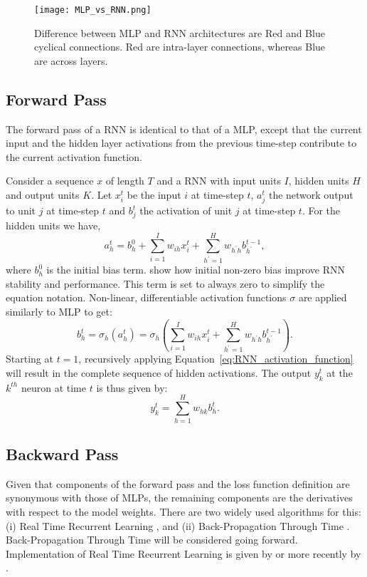 \begin{figure}[ht!]
	\centering
	\texttt{[image: MLP\_vs\_RNN.png]}
	\caption[Difference between MLP and RNN architectures.]{Difference between MLP and RNN architectures are Red and Blue cyclical connections. Red are intra-layer connections, whereas Blue are across layers.}
	\label{fig:MLP_vs_RNN}
\end{figure}

\subsection{Forward Pass}
The forward pass of a RNN is identical to that of a MLP, except that the current input and the hidden layer activations from the previous time-step contribute to the current activation function. 

Consider a sequence $x$ of length $T$ and a RNN with input units $I$, hidden units $H$ and output units $K$. Let $x_i^t$ be the input $i$ at time-step $t$, $a_j^t$
the network output to unit $j$ at time-step $t$ and $b_j^t$ the activation of unit $j$ at time-step $t$. For the hidden units we have,
\begin{equation}
	a_h^t=b_h^0+\sum_{i=1}^{I} w_{ih} x_i^t +\sum_{h^{'}=1}^{H}w_{h^{'}h} b_{h^{'}}^{t-1},
\end{equation}
where $b_h^0$ is the initial bias term. \cite{Zimmermann2006} show how initial non-zero bias improve RNN stability and performance. This term is set to always zero to simplify the equation notation. Non-linear, differentiable activation functions $\sigma$ are applied similarly to MLP to get:
\begin{equation}\label{eq:RNN_activation_function}
	b_h^t=\sigma_h \left(a_h^t\right)=\sigma_h \left(\sum_{i=1}^{I}w_{ih} x_i^t +\sum_{h^{'}=1}^{H} w_{h^{'} h} b_{h^{'}}^{t-1} \right).
\end{equation}
Starting at $t = 1$, recursively applying Equation~\ref{eq:RNN_activation_function} will result in the complete sequence of hidden activations. The output $y_k^t$ at the $k^{th}$ neuron at time $t$ is thus given by:
\begin{equation}
	y_k^t=\sum_{h=1}^{H}w_{hk} b_h^t.
\end{equation}
\subsection{Backward Pass}
Given that components of the forward pass and the loss function definition are synonymous with those of MLPs, the remaining components are the derivatives with respect to the model weights. There are two widely used algorithms for this: (i) Real Time Recurrent Learning \citep{Robinson1987}, and (ii) Back-Propagation Through Time \citep{Werbos1988}. Back-Propagation Through Time will be considered going forward. Implementation of Real Time Recurrent Learning is given by \cite{Williams1989} or more recently by \cite{Haykin2009}.

